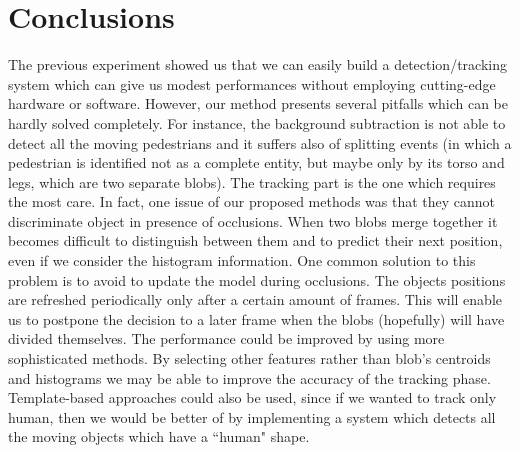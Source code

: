 \documentclass[runningheads]{llncs}
\begin{document}
\begin{table}[]
\centering
\caption{Mean and standard deviation of the detected trajectories with respect to the real ones.}
\label{table:disp}
\end{table}



\section{Conclusions}

The previous experiment showed us that we can easily build a detection/tracking system which can give us modest performances without employing cutting-edge hardware or software. However, our method presents several pitfalls which can be hardly solved completely. For instance, the background subtraction is not able to detect all the moving pedestrians and it suffers also of splitting events (in which a pedestrian is identified not as a complete entity, but maybe only by its torso and legs, which are two separate blobs). 
 The tracking part is the one which requires the most care. In fact, one issue of our proposed methods was that they cannot discriminate object in presence of occlusions. When two blobs merge together it becomes difficult to distinguish between them and to predict their next position, even if we consider the histogram information. One common solution to this problem is to avoid to update the model during occlusions. The objects positions are refreshed periodically only after a certain amount of frames. This will enable us to postpone the decision to a later frame when the blobs (hopefully) will have divided themselves.
The performance could be improved by using more sophisticated methods. 
By selecting other features rather than blob's centroids and histograms we may be able to improve the accuracy of the tracking phase. Template-based approaches could also be used, since if we wanted to track only human, then we would be better of by implementing a system which detects all the moving objects which have a ``human" shape.
\end{document}
